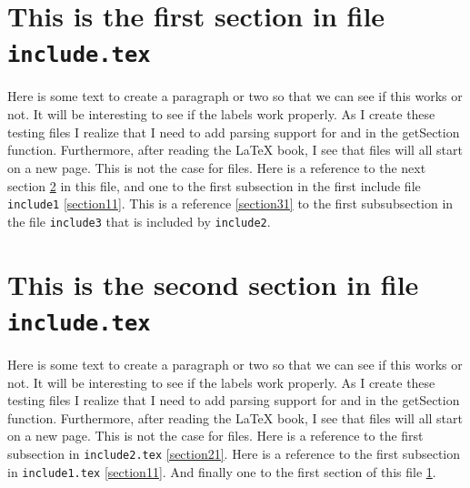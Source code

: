 ﻿\documentclass{article}
\begin{document}

\section{This is the first section in file \texttt{include.tex}}
\label{section01}

Here is some text to create a paragraph or two so that we
can see if this works or not.  It will be interesting to see
if the labels work properly.  As I create these testing files
I realize that I need to add parsing support for \verb##
and \verb## in the getSection function.   Furthermore,
after reading the \LaTeX{} book, I see that \verb## 
files will all start on a new page.  This is not the case for
\verb## files.  Here is a reference to the next section \ref{section02}
in this file,
and one to the first subsection in the first include file \texttt{include1} \ref{section11}. 
This is a reference \ref{section31} to the first subsubsection in 
the file \texttt{include3} that is included by \texttt{include2}.





\section{This is the second section in file \texttt{include.tex}}
\label{section02}

Here is some text to create a paragraph or two so that we
can see if this works or not.  It will be interesting to see
if the labels work properly.  As I create these testing files
I realize that I need to add parsing support for \verb##
and \verb## in the getSection function.   Furthermore,
after reading the \LaTeX{} book, I see that \verb## 
files will all start on a new page.  This is not the case for
\verb## files.  Here is a reference to the first subsection 
in \texttt{include2.tex} \ref{section21}.
Here is a reference to the first subsection in \texttt{include1.tex}
\ref{section11}. And finally one to the first section of this 
file \ref{section01}.


\end{document}
